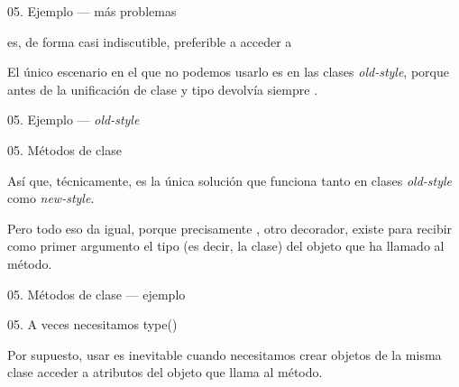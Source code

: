 \begin{frame}{05. Ejemplo — más problemas}
  \begin{alertblock}{}
    \centering
     es, de forma casi indiscutible, preferible
    a acceder a 
  \end{alertblock}

  \begin{center}
    \small
    El único escenario en el que no podemos usarlo es en las clases
    \textit{old-style}, porque antes de la unificación de clase y tipo
     devolvía siempre .
  \end{center}
\end{frame}

\begin{frame}{05. Ejemplo — \textit{old-style}}
  \scriptsize
\end{frame}

\begin{frame}{05. Métodos de clase}
  \begin{center}
    \small
    Así que, técnicamente,  es la única
    solución que funciona tanto en clases \textit{old-style} como
    \textit{new-style}.
  \end{center}

  \begin{alertblock}{}
    \center
    Pero todo eso da igual, porque precisamente
    , otro decorador, existe para recibir como
    primer argumento el tipo (es decir, la clase) del objeto que ha
    llamado al método.
  \end{alertblock}
\end{frame}

\begin{frame}{05. Métodos de clase — ejemplo}
  \scriptsize
\end{frame}

\begin{frame}{05. A veces necesitamos type()}
  \begin{alertblock}{}
    \centering
    Por supuesto, usar  es inevitable cuando
    necesitamos crear objetos de la misma clase  acceder
    a atributos del objeto que llama al método.
  \end{alertblock}
\end{frame}

